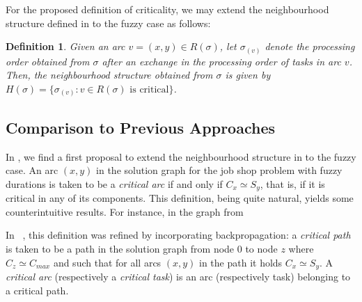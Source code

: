 \documentclass[letterpaper]{article}
\newtheorem{definition}{Definition}
\begin{document}
For the proposed definition of criticality, we may extend the neighbourhood structure defined in \cite{VanLaarhoven1992} to the fuzzy case as follows:
\begin{definition}\label{defNeighbourhoodHfuzzy}
Given an arc $v= (x,y) \in R(\sigma)$, let $\sigma_{(v)}$ denote the processing order obtained from $\sigma$ after an exchange in the processing order of tasks in arc $v$. Then, the \emph{neighbourhood structure} obtained from $\sigma$ is given by $H(\sigma) = \{ \sigma_{(v)}: v \in R(\sigma) \text{ is critical} \}$.
\end{definition}

\subsection{Comparison to Previous Approaches}\label{subsecComparison2Previous}
In \cite{Fortemps1997}, we find a first proposal to extend the neighbourhood structure in \cite{VanLaarhoven1992} to the fuzzy case. An arc $(x,y)$ in the solution graph for the job shop problem with fuzzy durations is taken to be a \emph{critical arc} if and only if $C_x \simeq S_y$, that is, if it is critical in any of its components. This definition, being quite natural, yields some counterintuitive results. For instance, in the graph from %

In ~\cite{GonzalezRodriguez2007b}, this definition was refined by incorporating backpropagation: a \emph{critical path} is taken to be a path in the solution graph from node $0$ to node $z$ where $C_z \simeq  C_{max}$ and such that for all arcs $(x,y)$ in the path it holds $C_x \simeq  S_y$. A \emph{critical arc} (respectively a \emph{critical task}) is an arc (respectively task) belonging to a critical path.
\end{document}
